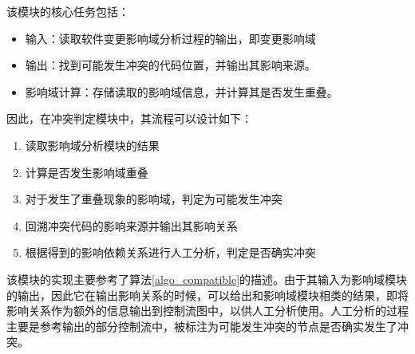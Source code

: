 该模块的核心任务包括：
\begin{itemize}
	\item 输入：读取软件变更影响域分析过程的输出，即变更影响域
	\item 输出：找到可能发生冲突的代码位置，并输出其影响来源。
	\item 影响域计算：存储读取的影响域信息，并计算其是否发生重叠。
\end{itemize}


因此，在冲突判定模块中，其流程可以设计如下：
\begin{enumerate}
	\item 读取影响域分析模块的结果
	\item 计算是否发生影响域重叠
	\item 对于发生了重叠现象的影响域，判定为可能发生冲突
	\item 回溯冲突代码的影响来源并输出其影响关系
	\item 根据得到的影响依赖关系进行人工分析，判定是否确实冲突
\end{enumerate}

%
%
%

该模块的实现主要参考了算法\ref {algo_compatible}的描述。由于其输入为影响域模块的输出，因此它在输出影响关系的时候，可以给出和影响域模块相类的结果，即将影响关系作为额外的信息输出到控制流图中，以供人工分析使用。人工分析的过程主要是参考输出的部分控制流中，被标注为可能发生冲突的节点是否确实发生了冲突。

